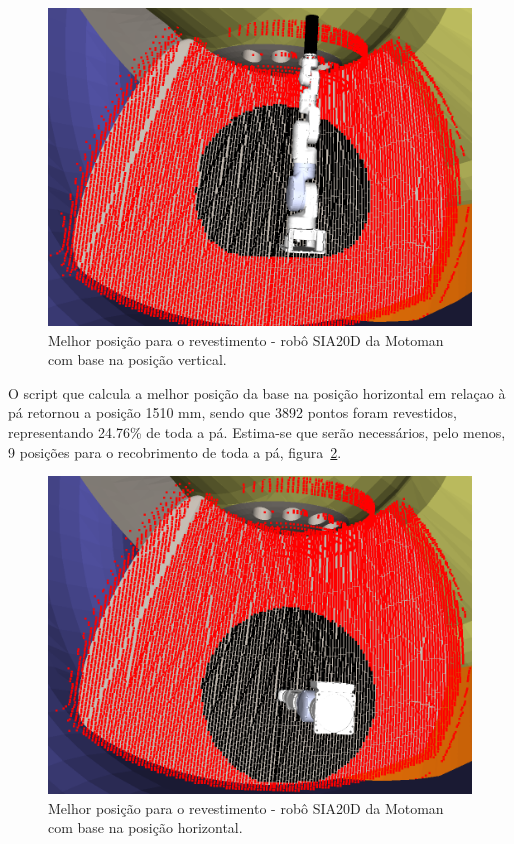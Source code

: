 \begin{figure}[h!]	
	\includegraphics[width=\columnwidth]{detail/figs/bighatch/sia20d_bestposv.png}
	\caption{Melhor posição para o revestimento - robô SIA20D da Motoman com base
	na posição vertical.}
	\label{fig::sia20dbestposv}
\end{figure}

O script que calcula a melhor posição da base na posição horizontal em relaçao à
pá retornou a posição 1510 mm, sendo que 3892 pontos foram revestidos,
representando 24.76\% de toda a pá. Estima-se que serão necessários, pelo menos,
9 posições para o recobrimento de toda a pá, figura~\ref{fig::sia20dbestposh}.

\begin{figure}[h!]	
	\includegraphics[width=\columnwidth]{detail/figs/bighatch/sia20d_bestposh.png}
	\caption{Melhor posição para o revestimento - robô SIA20D da Motoman com base
	na posição horizontal.}
	\label{fig::sia20dbestposh}
\end{figure}


